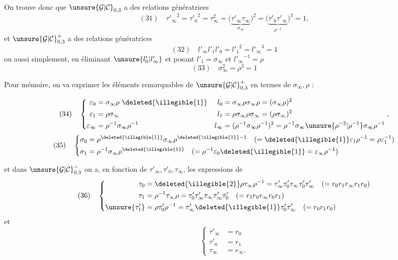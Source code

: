 On trouve donc que $\unsure{\mathcal{G}|\mathcal{C}}_{0,3}$ a des  relations génératrices
\[
(31)\quad
{\tau'_\infty}^{2}={\tau'_0}^{2}=\tau_\infty^2
=\bigl(\underbrace{\tau'_\infty\tau_\infty}_{\sigma_\infty}\bigr)^2
=\bigl(\underbrace{\tau'_0\tau'_\infty}_{\rho^{-1}}\bigr)^3=1,
\]
et $\unsure{\mathcal{G}|\mathcal{C}}_{0,3}^{+}$ a des relations génératrices
\[
(32)\quad l'_\infty l'_1l'_0={l'_1}^{2}={l'_\infty}^{3}=1
\]
ou aussi simplement, en éliminant $\unsure{l'_0|l'_\infty}$ et posant
$l'_1=\sigma_\infty$ et ${l'_\infty}^{-1}=\rho$
\[
(33)\quad\boxed{\sigma_\infty^2=\rho^3=1}
\]

Pour mémoire, on va exprimer les éléments remarquables de $\unsure{\mathcal{G}|\mathcal{C}}_{0,3}^{+}$ en termes de $\sigma_\infty,\rho$ :


\[
(34)\quad\left\{\begin{aligned}
\varepsilon_0&=\sigma_\infty\rho\ \deleted{\illegible{1}}&
l_0&=\sigma_\infty\rho\sigma_\infty\rho=(\sigma_\infty\rho)^2\\
\varepsilon_1&=\rho\sigma_\infty&
l_1&=\rho\sigma_\infty\rho\sigma_\infty=(\rho\sigma_\infty)^2\\
\varepsilon_\infty&=\rho^{-1}\sigma_\infty\rho^{-1}&
l_\infty&=(\rho^{-1}\sigma_\infty\rho^{-1})^2
=\rho^{-1}\sigma_\infty\unsure{\rho^{-2}|\rho^{-1}}\sigma_\infty\rho^{-1}
\end{aligned}\right.,
\]
\[
(35)\quad\left\{\begin{aligned}
\sigma_0&=\rho^{\deleted{\illegible{1}}}\sigma_\infty\rho^{\deleted{\illegible{1}}-1}
\quad(=\deleted{\illegible{1}}\varepsilon_1\rho^{-1}=\rho\varepsilon_1^{-1})\\
\sigma_1&=\rho^{-1}\sigma_\infty\rho^{\deleted{\illegible{1}}}
\quad(=\rho^{-1}\varepsilon_0\deleted{\illegible{1}}=\varepsilon_\infty\rho^{-1})
\end{aligned}\right.
\]

et dans $\unsure{\mathcal{G}|\mathcal{C}}_{0,3}^{-}$ on a, en fonction de $\tau'_\infty,\tau'_0,\tau_\infty$,
les expressions de 
\[
(36)\quad\left\{\begin{aligned}
\tau_0&=\deleted{\illegible{2}}\rho\tau_\infty\rho^{-1}
=\tau'_\infty\tau'_0\tau_\infty\tau'_0\tau'_\infty
\quad(=r_0r_1r_\infty r_1r_0)\\
\tau_1&=\rho^{-1}\tau_\infty\rho
=\tau'_0\tau'_\infty\tau_\infty\tau'_\infty\tau'_0
\quad(=r_1r_0r_\infty r_0r_1)\\
\unsure{\tau'_1}&=\rho\tau'_0\rho^{-1}
=\tau'_\infty\deleted{\illegible{1}}\tau'_0\tau'_\infty
\quad(=r_0r_1r_0)
\end{aligned}\right.
\]
et
\[
\left\{\begin{aligned}
\tau'_\infty&=r_0\\
\tau'_0&=r_1\\
\tau_\infty&=r_\infty.
\end{aligned}\right.
\]

